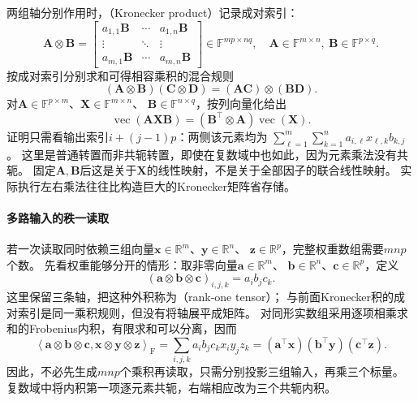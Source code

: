 两组轴分别作用时，（Kronecker product）记录成对索引：
\begin{equation}
 \bm A\otimes\bm B
 =\begin{bmatrix}
 a_{1,1}\bm B&\cdots&a_{1,n}\bm B\\
 \vdots&\ddots&\vdots\\
 a_{m,1}\bm B&\cdots&a_{m,n}\bm B
 \end{bmatrix}\in\mathbb F^{mp\times nq},
 \quad
 \bm A\in\mathbb F^{m\times n},\ \bm B\in\mathbb F^{p\times q}.
 \label{eq:linear-algebra-kronecker-product}
\end{equation}
按成对索引分别求和可得相容乘积的混合规则
\begin{equation}
 (\bm A\otimes\bm B)(\bm C\otimes\bm D)
 =(\bm A\bm C)\otimes(\bm B\bm D).
 \label{eq:matrix-analysis-kronecker-mixed-product}
\end{equation}
对$\bm A\in\mathbb F^{p\times m}$、$\bm X\in\mathbb F^{m\times n}$、
$\bm B\in\mathbb F^{n\times q}$，按列向量化给出
\begin{equation}
 \operatorname{vec}(\bm A\bm X\bm B)
 =(\bm B^\top\otimes\bm A)\operatorname{vec}(\bm X).
 \label{eq:matrix-analysis-vec-kronecker}
\end{equation}
证明只需看输出索引$i+(j-1)p$：两侧该元素均为
$\sum_{\ell=1}^m\sum_{k=1}^n a_{i,\ell}x_{\ell,k}b_{k,j}$。
这里是普通转置而非共轭转置，即使在复数域中也如此，因为元素乘法没有共轭。
固定$\bm A,\bm B$后这是关于$\bm X$的线性映射，不是关于全部因子的联合线性映射。
实际执行左右乘法往往比构造巨大的Kronecker矩阵省存储。

\paragraph{多路输入的秩一读取}
若一次读取同时依赖三组向量$\bm x\in\mathbb R^m$、$\bm y\in\mathbb R^n$、
$\bm z\in\mathbb R^p$，完整权重数组需要$mnp$个数。
先看权重能够分开的情形：取非零向量$\bm a\in\mathbb R^m$、
$\bm b\in\mathbb R^n$、$\bm c\in\mathbb R^p$，定义
\[
 (\bm a\otimes\bm b\otimes\bm c)_{i,j,k}=a_i b_j c_k.
\]
这里保留三条轴，把这种外积称为（rank-one tensor）；
与前面Kronecker积的成对索引是同一乘积规则，但没有将轴展平成矩阵。
对同形实数组采用逐项相乘求和的Frobenius内积，有限求和可以分离，因而
\begin{equation}
 \left\langle\bm a\otimes\bm b\otimes\bm c,
 \bm x\otimes\bm y\otimes\bm z\right\rangle_{\mathrm F}
 =\sum_{i,j,k}a_i b_j c_k x_i y_j z_k
 =(\bm a^\top\bm x)(\bm b^\top\bm y)(\bm c^\top\bm z).
 \label{eq:linear-algebra-rank-one-contraction}
\end{equation}
因此，不必先生成$mnp$个乘积再读取，只需分别投影三组输入，再乘三个标量。
复数域中将内积第一项逐元素共轭，右端相应改为三个共轭内积。

